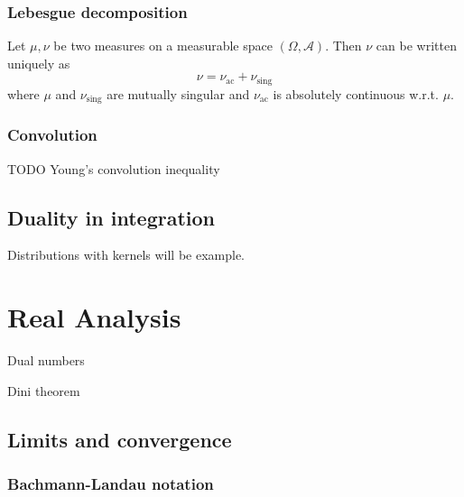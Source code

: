 \subsection{Lebesgue decomposition}
\begin{theorem}
Let $\mu, \nu$ be two measures on a measurable space $(\Omega, \mathcal{A})$. Then $\nu$ can be written uniquely as
\[ \nu = \nu_\text{ac} + \nu_\text{sing} \]
where $\mu$ and $\nu_\text{sing}$ are mutually singular and $\nu_\text{ac}$ is absolutely continuous w.r.t. $\mu$. 

\end{theorem}

\subsection{Convolution}
TODO Young's convolution inequality

\section{Duality in integration}
Distributions with kernels will be example.

\chapter{Real Analysis}
Dual numbers

Dini theorem

\section{Limits and convergence}

\subsection{Bachmann-Landau notation}
